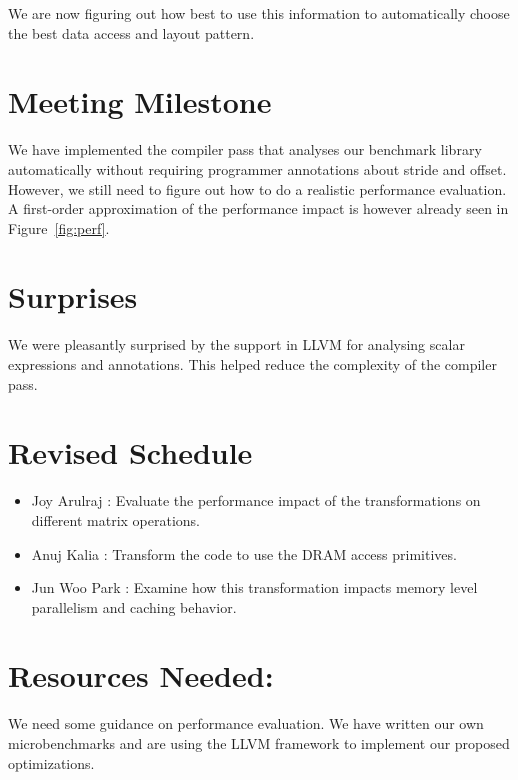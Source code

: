 \documentclass[letterpaper]{article}
\begin{document}
We are now figuring out how best to use this information to automatically
choose the best data access and layout pattern.

\section{Meeting Milestone}

We have implemented the compiler pass that analyses our benchmark library automatically without requiring
programmer annotations about stride and offset. However, we still need to figure out how to do
a realistic performance evaluation. A first-order approximation of the performance impact is
however already seen in Figure~\ref{fig:perf}. 

\section{Surprises}

We were pleasantly surprised by the support in LLVM for analysing scalar expressions and annotations.
This helped reduce the complexity of the compiler pass.

\section{Revised Schedule}

\begin{itemize}
\item Joy Arulraj : Evaluate the performance impact of the transformations on different matrix operations.
\item Anuj Kalia : Transform the code to use the DRAM access primitives.  
\item Jun Woo Park : Examine how this transformation impacts memory level parallelism and caching behavior.
\end{itemize}

\section{Resources Needed:} 

We need some guidance on performance evaluation. We have written our own microbenchmarks and
are using the LLVM framework to implement our proposed optimizations.

%
%
\end{document}
